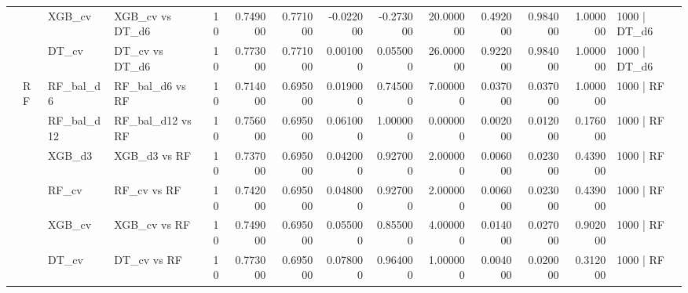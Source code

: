 \begin{tabular}{llllrrrrrrrrrl}
 &  & XGB_cv & XGB_cv vs DT_d6 & 10 & 0.749000 & 0.771000 & -0.022000 & -0.273000 & 20.000000 & 0.492000 & 0.984000 & 1.000000 & 1000 | DT_d6 \\
 &  & DT_cv & DT_cv vs DT_d6 & 10 & 0.773000 & 0.771000 & 0.001000 & 0.055000 & 26.000000 & 0.922000 & 0.984000 & 1.000000 & 1000 | DT_d6 \\
\cline{2-14}
 & \multirow[t]{6}{*}{RF} & RF_bal_d6 & RF_bal_d6 vs RF & 10 & 0.714000 & 0.695000 & 0.019000 & 0.745000 & 7.000000 & 0.037000 & 0.037000 & 1.000000 & 1000 | RF \\
 &  & RF_bal_d12 & RF_bal_d12 vs RF & 10 & 0.756000 & 0.695000 & 0.061000 & 1.000000 & 0.000000 & 0.002000 & 0.012000 & 0.176000 & 1000 | RF \\
 &  & XGB_d3 & XGB_d3 vs RF & 10 & 0.737000 & 0.695000 & 0.042000 & 0.927000 & 2.000000 & 0.006000 & 0.023000 & 0.439000 & 1000 | RF \\
 &  & RF_cv & RF_cv vs RF & 10 & 0.742000 & 0.695000 & 0.048000 & 0.927000 & 2.000000 & 0.006000 & 0.023000 & 0.439000 & 1000 | RF \\
 &  & XGB_cv & XGB_cv vs RF & 10 & 0.749000 & 0.695000 & 0.055000 & 0.855000 & 4.000000 & 0.014000 & 0.027000 & 0.902000 & 1000 | RF \\
 &  & DT_cv & DT_cv vs RF & 10 & 0.773000 & 0.695000 & 0.078000 & 0.964000 & 1.000000 & 0.004000 & 0.020000 & 0.312000 & 1000 | RF \\
\cline{1-14} \cline{2-14}
\bottomrule
\end{tabular}
